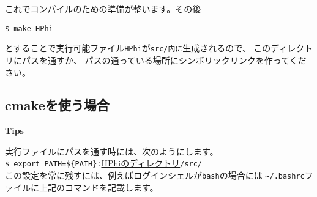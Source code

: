 これでコンパイルのための準備が整います。その後
\begin{verbatim}
$ make HPhi
\end{verbatim}
とすることで実行可能ファイル\verb|HPhi|が\verb|src/内に|生成されるので、
このディレクトリにパスを通すか、
パスの通っている場所にシンボリックリンクを作ってください。

\subsection{cmakeを使う場合}

\begin{screen}
\Large 
{\bf Tips}
\normalsize

実行ファイルにパスを通す時には、次のようにします。
\\
\verb|$ export PATH=${PATH}:|\underline{HPhiのディレクトリ}\verb|/src/|
\\
この設定を常に残すには、例えばログインシェルが\verb|bash|の場合には
\verb|~/.bashrc|ファイルに上記のコマンドを記載します。

\end{screen}
